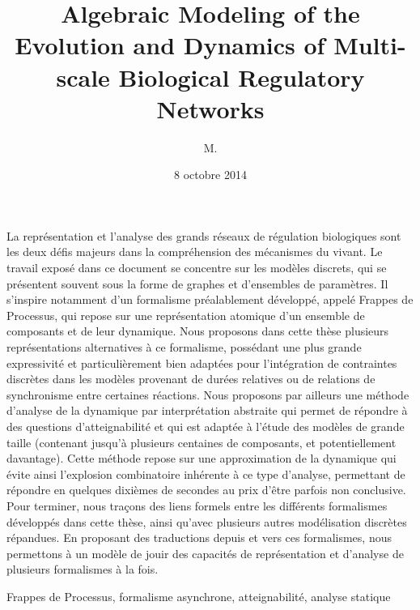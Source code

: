 \documentclass[12pt,french,francais,nofancyChapter,nofancyPart]{these-LUNAM}
\title{Algebraic Modeling of the Evolution and Dynamics of Multi-scale
  Biological Regulatory Networks}
\subtitle{\TODO}
\author{M.}{Maxime}{Folschette}
\date{8 octobre 2014}
\theoremstyle{definition}
\theoremstyle{remark}
\begin{document}
\begin{resume}
  \scriptsize
  La représentation et l'analyse des grands réseaux de régulation biologiques
  sont les deux défis majeurs dans la compréhension des mécanismes du vivant.
  Le travail exposé dans ce document se concentre sur les modèles discrets,
  qui se présentent souvent sous la forme de graphes et d'ensembles de paramètres.
  Il s'inspire notamment d'un formalisme préalablement développé,
  appelé Frappes de Processus,
  qui repose sur une représentation atomique d'un ensemble de composants et de leur dynamique.
  Nous proposons dans cette thèse plusieurs représentations alternatives à
  ce formalisme, possédant une plus grande expressivité
  et particulièrement bien adaptées pour l'intégration
  de contraintes discrètes dans les modèles
  provenant de durées relatives ou de relations de synchronisme entre certaines réactions.
  Nous proposons par ailleurs
  une méthode d'analyse de la dynamique par interprétation abstraite
  qui permet de répondre à des questions d'atteignabilité
  et qui est adaptée à l'étude des modèles de grande taille
  (contenant jusqu'à plusieurs centaines de composants, et potentiellement davantage).
  Cette méthode repose sur une approximation de la dynamique qui évite ainsi
  l'explosion combinatoire inhérente à ce type d'analyse,
  permettant de répondre en quelques dixièmes de secondes au prix d'être parfois non conclusive.
  Pour terminer, nous traçons des liens formels entre
  les différents formalismes développés dans cette
  thèse, ainsi qu'avec plusieurs autres modélisation discrètes répandues.
  En proposant des traductions depuis et vers ces formalismes,
  nous permettons à un modèle de jouir des capacités de représentation et d'analyse
  de plusieurs formalismes à la fois.
\end{resume}

\begin{motscles}
  Frappes de Processus,
  formalisme asynchrone,
  atteignabilité,
  analyse statique
\end{motscles}
\end{document}
